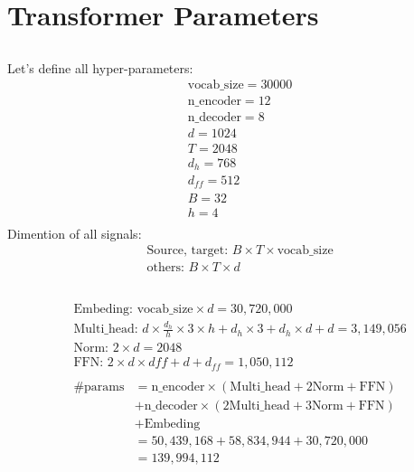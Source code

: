 \documentclass{article}
\begin{document}
\section{Transformer Parameters}
\subsection{}
Let's define all hyper-parameters:
\begin{align*}
    &\text{vocab\_size} = 30000 \\
    &\text{n\_encoder} = 12 \\
    &\text{n\_decoder} = 8 \\
    &d = 1024 \\
    &T = 2048 \\
    &d_h = 768 \\
    &d_{ff} = 512 \\
    &B = 32 \\
    &h = 4 \\
\end{align*}
Dimention of all signals:
\begin{align*}
    &\text{Source, target: } B \times T \times \text{vocab\_size} \\
    &\text{others: } B \times T \times d
\end{align*}


\subsection{}
\begin{align*}
    &\text{Embeding: } \text{vocab\_size} \times d  = 30,720,000\\
    &\text{Multi\_head: } d \times \frac{d_h}{h} \times 3 \times h + d_h \times 3 + d_h \times d + d = 3,149,056\\
    &\text{Norm: } 2 \times d = 2048\\
    &\text{FFN: } 2 \times d \times d{ff} + d + d_{ff} = 1,050,112\\
\end{align*}
\begin{align*}
    \text{\# params} 
    &= \text{n\_encoder} \times (\text{Multi\_head} + 2 \text{Norm} + \text{FFN}) \\
    &+ \text{n\_decoder} \times (2\text{Multi\_head} + 3\text{Norm} + \text{FFN}) \\
    &+ \text{Embeding} \\
    &= 50,439,168 + 58,834,944 + 30,720,000 \\
    &= 139,994,112
\end{align*}
\end{document}
